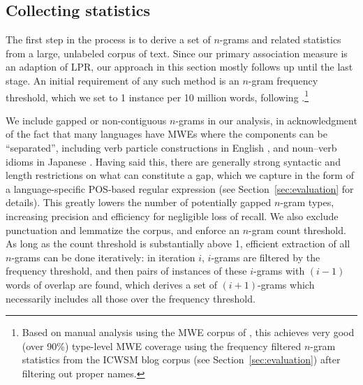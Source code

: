 \documentclass[11pt,letterpaper]{article}
\newcommand{\secref}[2][]{Section#1~\ref{#2}\xspace}
\begin{document}
\subsection{Collecting statistics}

The first step in the process is to derive a set of $n$-grams and related statistics from a large, unlabeled corpus of text. Since our primary association measure is an adaption of LPR, our approach in this section mostly follows  up until the last stage. An initial requirement of any such method is an $n$-gram frequency threshold, which we set to 1 instance per 10 million words, following .\footnote{Based on manual analysis using the MWE corpus of , this achieves very good (over 90\%) type-level MWE coverage using the frequency filtered $n$-gram statistics from the ICWSM blog corpus (see \secref{sec:evaluation}) after filtering out proper names.} 

We include gapped or non-contiguous $n$-grams in our analysis, in acknowledgment of the fact that many languages have MWEs where the components can be ``separated'', including verb particle constructions in English \cite{Dehe:2002}, and noun--verb idioms in Japanese \cite{Hashimoto:Kawahara:2008}. Having said this, there are generally strong syntactic and length \cite{Wasow:2002} restrictions on what can constitute a gap, which we capture in the form of a language-specific POS-based regular expression (see \secref{sec:evaluation} for details).
This greatly lowers the number of potentially gapped $n$-gram types, increasing precision and efficiency for negligible loss of recall. We also exclude punctuation and lemmatize the corpus, and enforce an $n$-gram count threshold. As long as the count threshold  is substantially above 1, efficient extraction of all $n$-grams can be done iteratively: in iteration $i$, $i$-grams are filtered by the frequency threshold, and then pairs of instances of these $i$-grams with $(i-1)$ words of overlap are found, which derives a set of $(i+1)$-grams which necessarily includes all those over the frequency threshold. 
\end{document}

